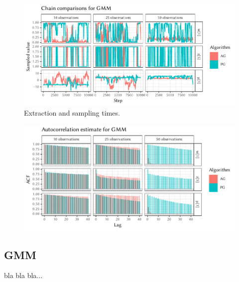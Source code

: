\begin{figure}[p]
  \par
  \includegraphics[width=\textwidth]{figures/GMM-chains}
  \caption{Extraction and sampling times.}
\end{figure}

\cleartorecto
\FloatBlock

\begin{figure}[t]
  \centering
  \includegraphics[width=\textwidth]{figures/GMM-acfs}
  \label{fig:plots-gmm}
\end{figure}

\subsection*{GMM}

bla bla bla...

\cleartoverso
\FloatBlock

